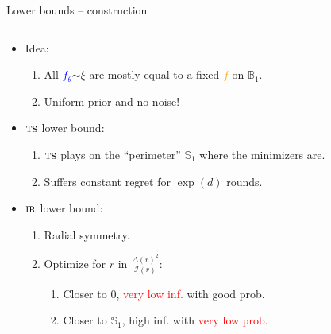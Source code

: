 \documentclass{beamer}
\newcommand{\ball}{\mathbb{B}}
\newcommand{\sphere}{\mathbb{S}}
\newcommand{\cI}{\mathcal{I}}
\newcommand{\ts}{{\textsc{ts}}}
\newcommand{\IR}{\operatorname{\textsc{ir}}}
\begin{document}
\begin{frame}{Lower bounds -- construction}
    \begin{columns}
        \begin{column}{0.7\textwidth}
            \begin{itemize}
                \item Idea:
                      \begin{enumerate}
                          \leftskip=-1em %
                          \item All \textcolor{blue}{$f_\theta$}$\sim \xi$ are mostly equal to a fixed \textcolor{orange}{$f$} on $\ball_1$.
                          \item Uniform prior and no noise!
                      \end{enumerate}
                \item $\ts$ lower bound:
                      \begin{enumerate}
                          \leftskip=-1em %
                          \item $\ts$ plays on the ``perimeter'' $\sphere_1$ where the minimizers are.
                          \item Suffers constant regret for $\exp(d)$ rounds.
                      \end{enumerate}
                \item $\IR$ lower bound:
                      \begin{enumerate}
                          \leftskip=-1em %
                          \item Radial symmetry.
                          \item Optimize for $r$ in $\frac{\Delta(r)^2}{\cI(r)}$:
                                \begin{enumerate}
                                    \leftskip=-1em %
                                    \item Closer to $0$, \textcolor{red}{very low inf.} with \textcolor{green!70!black}{good prob}.
                                    \item Closer to $\sphere_1$, \textcolor{green!70!black}{high inf.} with \textcolor{red}{very low prob.}
                                \end{enumerate}
                      \end{enumerate}

\end{itemize}
\end{column}
\end{columns}
\end{frame}
\end{document}
